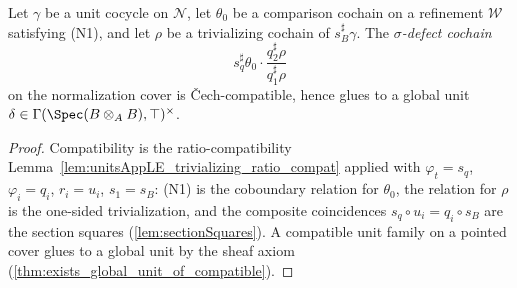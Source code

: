 \begin{theorem}
  \label{thm:exists_glued_sigmaDefect}
  \leanok
  Let \(\gamma\) be a unit cocycle on \(\mathcal N\), let \(\theta_0\) be a comparison cochain on
  a refinement \(\mathcal W\) satisfying (N1), and let \(\rho\) be a trivializing cochain of
  \(s_B^{\sharp}\gamma\). The \emph{\(\sigma\)-defect cochain}
  \[
    s_q^{\sharp}\theta_0 \cdot \frac{q_2^{\sharp}\rho}{q_1^{\sharp}\rho}
  \]
  on the normalization cover is \v Cech-compatible, hence glues to a global unit \(\delta \in
  \Gamma(\Spec(B \otimes_A B), \top)^{\times}\).
\end{theorem}
\begin{proof}
  \leanok
  Compatibility is the ratio-compatibility Lemma~\ref{lem:unitsAppLE_trivializing_ratio_compat}
  applied with \(\varphi_t = s_q\), \(\varphi_i = q_i\), \(r_i = u_i\), \(s_1 = s_B\): (N1) is
  the coboundary relation for \(\theta_0\), the relation for \(\rho\) is the one-sided
  trivialization, and the composite coincidences \(s_q \circ u_i = q_i \circ s_B\) are the
  section squares (\ref{lem:sectionSquares}). A compatible unit family on a pointed cover glues to
  a global unit by the sheaf axiom (\ref{thm:exists_global_unit_of_compatible}).
\end{proof}

